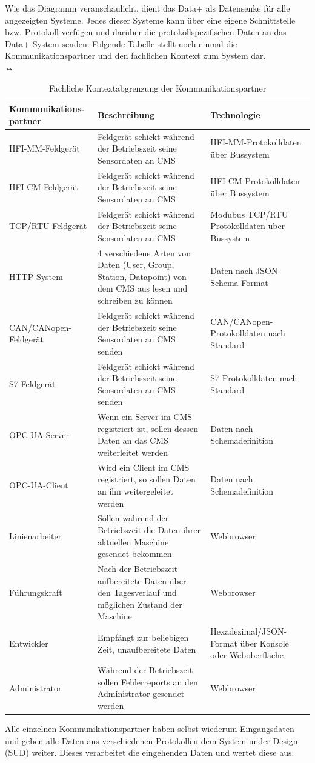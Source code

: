 Wie das Diagramm veranschaulicht, dient das Data+ als Datensenke für alle angezeigten Systeme. Jedes dieser Systeme kann über eine eigene Schnittstelle bzw. Protokoll verfügen und darüber die protokollspezifischen Daten an das Data+ System senden.
Folgende Tabelle stellt noch einmal die Kommunikationspartner und den fachlichen Kontext zum System dar.\\↔
\begin{table}[th]
	\begin{tabularx}{\textwidth}{|p{3.5cm}|p{7cm}|X|}
		\hline
		Kommunikations-
		partner & Beschreibung & Technologie \\
		\hline
		HFI-MM-Feldgerät &Feldgerät schickt während der Betriebszeit seine Sensordaten an CMS  & HFI-MM-Protokolldaten über Bussystem\\
		\hline
		HFI-CM-Feldgerät & Feldgerät schickt während der Betriebszeit seine Sensordaten an CMS  & HFI-CM-Protokolldaten über Bussystem\\
		\hline
		TCP/RTU-Feldgerät &Feldgerät schickt während der Betriebszeit seine Sensordaten an CMS  & Modubus TCP/RTU Protokolldaten über Bussystem \\
		\hline
		HTTP-System & 4 verschiedene Arten von Daten (User, Group, Station, Datapoint) von dem CMS aus lesen und schreiben zu können & Daten nach JSON-Schema-Format \\
		\hline
		CAN/CANopen-Feldgerät & Feldgerät schickt während der Betriebszeit seine Sensordaten an CMS senden & CAN/CANopen-Protokolldaten nach Standard\\
		\hline
		S7-Feldgerät &Feldgerät schickt während der Betriebszeit seine Sensordaten an CMS senden & S7-Protokolldaten nach Standard\\
		\hline
		OPC-UA-Server & Wenn ein Server im CMS registriert ist, sollen dessen Daten an das CMS weiterleitet werden & Daten nach Schemadefinition\\
		\hline
		OPC-UA-Client & Wird ein Client im CMS registriert, so sollen Daten an ihn weitergeleitet werden & Daten nach Schemadefinition\\
		\hline
		Linienarbeiter & Sollen während der Betriebszeit die Daten ihrer aktuellen Maschine gesendet bekommen & Webbrowser\\
		\hline
		Führungskraft & Nach der Betriebszeit aufbereitete Daten über den Tagesverlauf und möglichen Zustand der Maschine & Webbrowser\\
		\hline
		Entwickler & Empfängt zur beliebigen Zeit, unaufbereitete Daten & Hexadezimal/JSON-Format über Konsole oder Weboberfläche\\
		\hline
		Administrator & Während der Betriebszeit sollen Fehlerreports an den Administrator gesendet werden & Webbrowser\\
		\hline
	\end{tabularx} 
	\caption{Fachliche Kontextabgrenzung der Kommunikationspartner}
	\label{tab:FachlicheKontextabgrenzungDerKommunikationspartner}
\end{table}
Alle einzelnen Kommunikationspartner haben selbst wiederum Eingangsdaten und geben alle Daten aus verschiedenen Protokollen dem System under Design (SUD) weiter. Dieses verarbeitet die eingehenden Daten und wertet diese aus.
\clearpage
